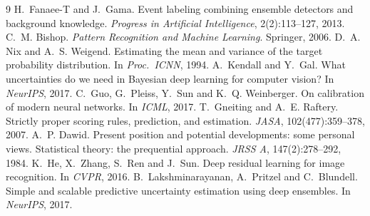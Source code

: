\documentclass[11pt,a4paper]{article}
\begin{document}
\begin{thebibliography}{9}
 H.~Fanaee-T and J.~Gama. Event labeling combining ensemble detectors and
background knowledge. \emph{Progress in Artificial Intelligence}, 2(2):113--127, 2013.
 C.~M. Bishop. \emph{Pattern Recognition and Machine Learning}. Springer, 2006.
 D.~A. Nix and A.~S. Weigend. Estimating the mean and variance of the target
probability distribution. In \emph{Proc.\ ICNN}, 1994.
 A.~Kendall and Y.~Gal. What uncertainties do we need in Bayesian deep learning
for computer vision? In \emph{NeurIPS}, 2017.
 C.~Guo, G.~Pleiss, Y.~Sun and K.~Q. Weinberger. On calibration of modern neural
networks. In \emph{ICML}, 2017.
 T.~Gneiting and A.~E. Raftery. Strictly proper scoring rules, prediction, and
estimation. \emph{JASA}, 102(477):359--378, 2007.
 A.~P. Dawid. Present position and potential developments: some personal views.
Statistical theory: the prequential approach. \emph{JRSS A}, 147(2):278--292, 1984.
 K.~He, X.~Zhang, S.~Ren and J.~Sun. Deep residual learning for image recognition.
In \emph{CVPR}, 2016.
 B.~Lakshminarayanan, A.~Pritzel and C.~Blundell. Simple and scalable
predictive uncertainty estimation using deep ensembles. In \emph{NeurIPS}, 2017.
\end{thebibliography}
\end{document}
